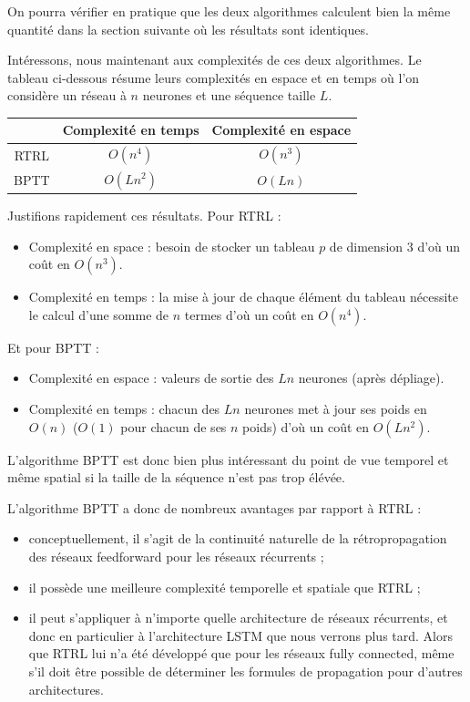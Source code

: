 On pourra vérifier en pratique que les deux algorithmes calculent bien la même quantité dans la section suivante où les résultats sont identiques.

Intéressons, nous maintenant aux complexités de ces deux algorithmes. Le tableau ci-dessous résume leurs complexités en espace et en temps où l'on considère un réseau à $n$ neurones et une séquence taille $L$.

\begin{center}
\begin{tabular}{|c|c|c|}
\hline
& Complexité en temps & Complexité en espace \\
\hline 
RTRL & $O(n^4)$ & $O(n^{3})$ \\
\hline
BPTT & $O(Ln^2)$ & $O(Ln)$ \\
\hline
\end{tabular}
\end{center}

Justifions rapidement ces résultats. Pour RTRL :
\begin{itemize}
\item Complexité en space : besoin de stocker un tableau $p$ de dimension $3$ d'où un coût en $O(n^3)$.
\item Complexité en temps : la mise à jour de chaque élément du tableau nécessite le calcul d'une somme de $n$ termes d'où un coût en $O(n^4)$.
\end{itemize}

Et pour BPTT :
\begin{itemize}
\item Complexité en espace : valeurs de sortie des $Ln$ neurones (après dépliage).
\item Complexité en temps : chacun des $Ln$ neurones met à jour ses poids en $O(n)$ ($O(1)$ pour chacun de ses $n$ poids) d'où un coût en $O(Ln^2)$.
\end{itemize}

L'algorithme BPTT est donc bien plus intéressant du point de vue temporel et même spatial si la taille de la séquence n'est pas trop élévée.

L'algorithme BPTT a donc de nombreux avantages par rapport à RTRL :
\begin{itemize}
\item conceptuellement, il s'agit de la continuité naturelle de la rétropropagation des réseaux feedforward pour les réseaux récurrents ;
\item il possède une meilleure complexité temporelle et spatiale que RTRL ;
\item il peut s'appliquer à n'importe quelle architecture de réseaux récurrents, et donc en particulier à l'architecture LSTM que nous verrons plus tard. Alors que RTRL lui n'a été développé que pour les réseaux fully connected, même s'il doit être possible de déterminer les formules de propagation pour d'autres architectures.
\end{itemize}

